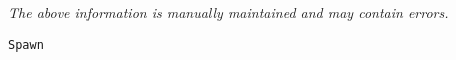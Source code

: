 \label{pkg:spawn}

{\tiny \it The above information is manually maintained and may contain errors.}
\begin{verbatim}
Spawn
\end{verbatim}
